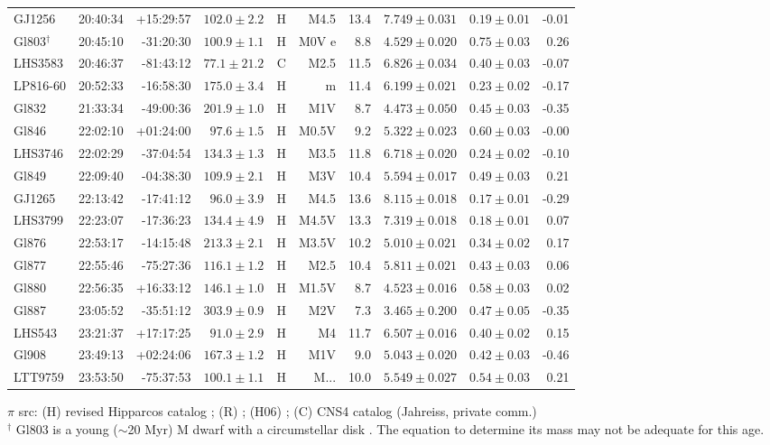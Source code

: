 \documentclass[structabstract]{aa}
\begin{document}
\begin{center}
\begin{longtable}{ l r r r r r r r r r}
GJ1256 & 20:40:34 & +15:29:57 & $102.0\pm 2.2$ & H & M4.5 & 13.4 & $7.749\pm0.031$ & $0.19\pm0.01$ & -0.01 \\
Gl803$^{\dag}$ & 20:45:10 & -31:20:30 & $100.9\pm 1.1$ & H & M0V e &  8.8 & $4.529\pm0.020$ & $0.75\pm0.03$ & 0.26 \\
LHS3583 & 20:46:37 & -81:43:12 & $77.1\pm21.2$ & C & M2.5 & 11.5 & $6.826\pm0.034$ & $0.40\pm0.03$ & -0.07 \\
LP816-60 & 20:52:33 & -16:58:30 & $175.0\pm 3.4$ & H & m & 11.4 & $6.199\pm0.021$ & $0.23\pm0.02$ & -0.17 \\
Gl832 & 21:33:34 & -49:00:36 & $201.9\pm 1.0$ & H & M1V &  8.7 & $4.473\pm0.050$ & $0.45\pm0.03$ & -0.35 \\
Gl846 & 22:02:10 & +01:24:00 & $97.6\pm 1.5$ & H & M0.5V &  9.2 & $5.322\pm0.023$ & $0.60\pm0.03$ & -0.00 \\
LHS3746 & 22:02:29 & -37:04:54 & $134.3\pm 1.3$ & H & M3.5 & 11.8 & $6.718\pm0.020$ & $0.24\pm0.02$ & -0.10 \\
Gl849 & 22:09:40 & -04:38:30 & $109.9\pm 2.1$ & H & M3V & 10.4 & $5.594\pm0.017$ & $0.49\pm0.03$ & 0.21 \\
GJ1265 & 22:13:42 & -17:41:12 & $96.0\pm 3.9$ & H & M4.5 & 13.6 & $8.115\pm0.018$ & $0.17\pm0.01$ & -0.29 \\
LHS3799 & 22:23:07 & -17:36:23 & $134.4\pm 4.9$ & H & M4.5V & 13.3 & $7.319\pm0.018$ & $0.18\pm0.01$ & 0.07 \\
Gl876 & 22:53:17 & -14:15:48 & $213.3\pm 2.1$ & H & M3.5V & 10.2 & $5.010\pm0.021$ & $0.34\pm0.02$ & 0.17 \\
Gl877 & 22:55:46 & -75:27:36 & $116.1\pm 1.2$ & H & M2.5 & 10.4 & $5.811\pm0.021$ & $0.43\pm0.03$ & 0.06 \\
Gl880 & 22:56:35 & +16:33:12 & $146.1\pm 1.0$ & H & M1.5V &  8.7 & $4.523\pm0.016$ & $0.58\pm0.03$ & 0.02 \\
Gl887 & 23:05:52 & -35:51:12 & $303.9\pm 0.9$ & H & M2V &  7.3 & $3.465\pm0.200$ & $0.47\pm0.05$ & -0.35 \\
LHS543 & 23:21:37 & +17:17:25 & $91.0\pm 2.9$ & H & M4 & 11.7 & $6.507\pm0.016$ & $0.40\pm0.02$ & 0.15 \\
Gl908 & 23:49:13 & +02:24:06 & $167.3\pm 1.2$ & H & M1V &  9.0 & $5.043\pm0.020$ & $0.42\pm0.03$ & -0.46 \\
LTT9759 & 23:53:50 & -75:37:53 & $100.1\pm 1.1$ & H & M... & 10.0 & $5.549\pm0.027$ & $0.54\pm0.03$ & 0.21 \\
\hline
\hline
\end{longtable}
\raggedright{
\small
$\pi$ src: (H) revised Hipparcos catalog \citep{van_Leeuwen-2007}; (R) \citep{Reid-1995}; (H06) \citep{Henry-2006}; (C) CNS4 catalog (Jahreiss, 
private comm.) \\
$^{\dag}$ Gl803 is a young ($\sim$20 Myr) M dwarf with a circumstellar disk \citep{Kalas-2004}. The equation to determine its mass may not be adequate for this age. \\}

\end{center}
\end{document}
